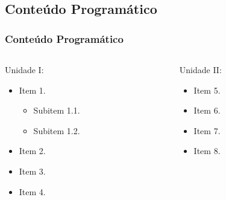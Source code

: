 \subsection[Conteúdo Programático]{Conteúdo Programático}\label{subsec:plano-ensino-conteudo}



\begin{frame}[t]\frametitle{Conteúdo Programático}

  \begin{columns}[onlytextwidth,T]

    \begin{column}{0.48\linewidth}
      \begin{block}{Unidade I:}
        \begin{itemize}\small
          \justifying{}
          \item Item 1.
          \begin{itemize}\scriptsize
            \justifying{}
            \item Subitem 1.1.
            \item Subitem 1.2.
          \end{itemize}
          \item Item 2.
          \item Item 3.
          \item Item 4.
        \end{itemize}
      \end{block}
    \end{column}

    \begin{column}{0.48\linewidth}
      \begin{block}{Unidade II:}
        \begin{itemize}\small
          \justifying{}
          \item Item 5.
          \item Item 6.
          \item Item 7.
          \item Item 8.
        \end{itemize}
      \end{block}
    \end{column}

  \end{columns}

\end{frame}



